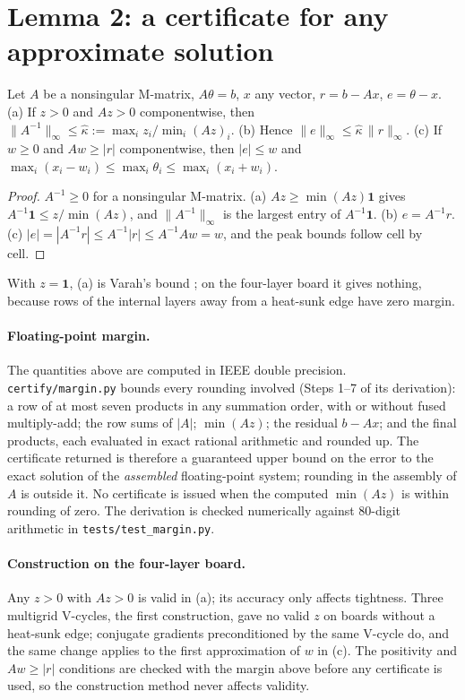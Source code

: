 \section{Lemma 2: a certificate for any approximate solution}
\begin{lemma}\label{lem:2}
Let $A$ be a nonsingular M-matrix, $A\theta=b$, $x$ any vector, $r=b-Ax$, $e=\theta-x$.
(a) If $z>0$ and $Az>0$ componentwise, then
$\|A^{-1}\|_\infty \le \hat\kappa := \max_i z_i/\min_i(Az)_i$.
(b) Hence $\|e\|_\infty \le \hat\kappa\,\|r\|_\infty$.
(c) If $w\ge0$ and $Aw\ge|r|$ componentwise, then $|e|\le w$ and
$\max_i(x_i-w_i)\le\max_i\theta_i\le\max_i(x_i+w_i)$.
\end{lemma}
\begin{proof}
$A^{-1}\ge0$ for a nonsingular M-matrix. (a) $Az\ge\min(Az)\mathbf 1$ gives
$A^{-1}\mathbf 1\le z/\min(Az)$, and $\|A^{-1}\|_\infty$ is the largest entry of $A^{-1}\mathbf 1$.
(b) $e=A^{-1}r$. (c) $|e| = |A^{-1}r| \le A^{-1}|r| \le A^{-1}Aw = w$, and the peak bounds follow
cell by cell.
\end{proof}
With $z=\mathbf 1$, (a) is Varah's bound \cite{varah1975}; on the four-layer board it gives
nothing, because rows of the internal layers away from a heat-sunk edge have zero margin.

\paragraph{Floating-point margin.} The quantities above are computed in IEEE double precision.
\texttt{certify/margin.py} bounds every rounding involved (Steps 1--7 of its derivation): a row of
at most seven products in any summation order, with or without fused multiply-add; the row sums of
$|A|$; $\min(Az)$; the residual $b-Ax$; and the final products, each evaluated in exact rational
arithmetic and rounded up. The certificate returned is therefore a guaranteed upper bound on the
error to the exact solution of the \emph{assembled} floating-point system; rounding in the assembly
of $A$ is outside it. No certificate is issued when the computed $\min(Az)$ is within rounding of
zero. The derivation is checked numerically against 80-digit arithmetic in
\texttt{tests/test\_margin.py}.

\paragraph{Construction on the four-layer board.} Any $z>0$ with $Az>0$ is valid in (a); its
accuracy only affects tightness. Three multigrid V-cycles, the first construction, gave no valid
$z$ on boards without a heat-sunk edge; conjugate gradients preconditioned by the same V-cycle do,
and the same change applies to the first approximation of $w$ in (c). The positivity and
$Aw\ge|r|$ conditions are checked with the margin above before any certificate is used, so the
construction method never affects validity.

